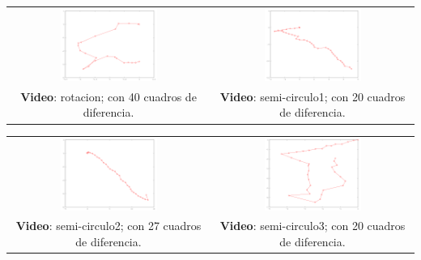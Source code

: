 \documentclass[10pt, a4paper,english,spanish,hidelinks]{article}
\begin{document}
\begin{center}
\begin{tabular}{c c} 
\includegraphics[width=0.5\textwidth]{./img/rotacion40.png} &
\includegraphics[width=0.5\textwidth]{./img/semi-circulo1-20.png} \\
 \small{\textbf{Video}: rotacion; con 40 cuadros de diferencia.} &
 \small{\textbf{Video}: semi-circulo1; con 20 cuadros de diferencia.} \\
 \end{tabular}
\end{center}
\begin{center}
\begin{tabular}{c c} 
\includegraphics[width=0.5\textwidth]{./img/semi-circulo2-27.png} &
\includegraphics[width=0.5\textwidth]{./img/semi-circulo3-20.png} \\
 \small{\textbf{Video}: semi-circulo2; con 27 cuadros de diferencia.} &
 \small{\textbf{Video}: semi-circulo3; con 20 cuadros de diferencia.} \\
 \end{tabular}
\end{center}
\end{document}
